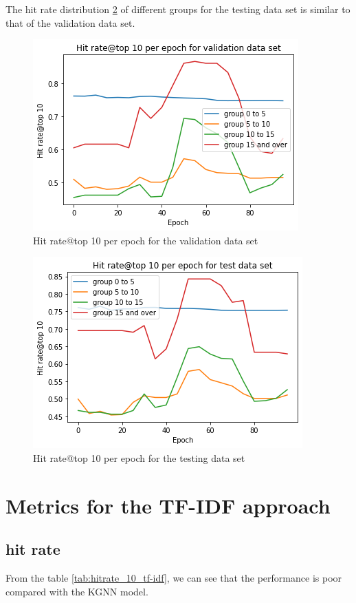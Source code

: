 \documentclass[11pt,twoside]{report}
\begin{document}
The hit rate distribution \ref{fig:hitrate_10_test} of different groups for the testing data set is similar to that of the validation data set.

\begin{figure}[H]
    \centering
    \includegraphics[scale=0.9]{hitrate@10_valid.png}
    \caption{Hit rate@top 10 per epoch for the validation data set}
    \label{fig:hitrate_10_valid}
\end{figure}

\begin{figure}[H]
    \centering
    \includegraphics[scale=0.9]{hitrate@10_test.png}
    \caption{Hit rate@top 10 per epoch for the testing data set}
    \label{fig:hitrate_10_test}
\end{figure}

\section{Metrics for the TF-IDF approach}
\subsection{hit rate}
From the table \ref{tab:hitrate_10_tf-idf}, we can see that the performance is poor compared with the KGNN model.
\end{document}
